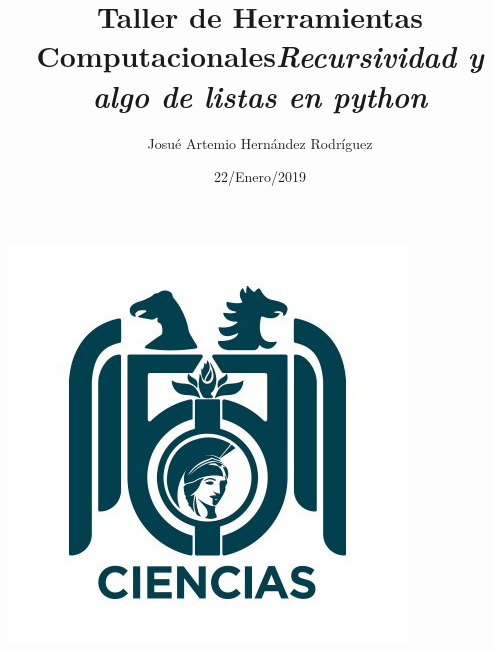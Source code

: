 \documentclass[letterpaper, 12pt,oneside]{article}
\title{\Huge Taller de Herramientas Computacionales}
\author{Josué Artemio Hernández Rodríguez}
\date{22/Enero/2019}
\begin{document}
	\maketitle
	\begin{center}
		\includegraphics[scale=0.7]{3.jpg}
	\end{center}

	\newpage
	
	\title{\huge \textit{Recursividad y algo de listas en python }}\\
	
\end{document}
